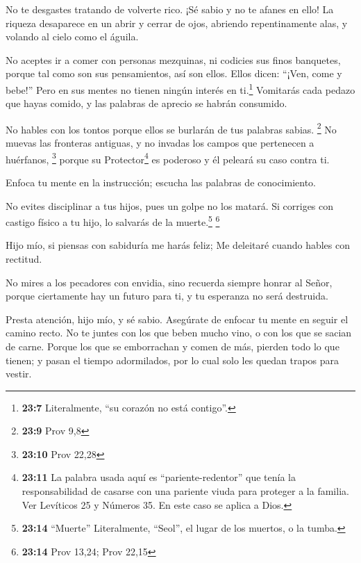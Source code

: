 No te desgastes tratando de volverte rico. ¡Sé sabio y no
te afanes en ello!  La riqueza desaparece en un abrir y
cerrar de ojos, abriendo repentinamente alas, y volando al cielo como el
águila.

 No aceptes ir a comer con personas mezquinas, ni codicies
sus finos banquetes,  porque tal como son sus
pensamientos, así son ellos. Ellos dicen: ``¡Ven, come y bebe!'' Pero en
sus mentes no tienen ningún interés en ti.\footnote{\textbf{23:7}
  Literalmente, ``su corazón no está contigo''.} 
Vomitarás cada pedazo que hayas comido, y las palabras de aprecio se
habrán consumido.

 No hables con los tontos porque ellos se burlarán de tus
palabras sabias. \footnote{\textbf{23:9} Prov 9,8}  No
muevas las fronteras antiguas, y no invadas los campos que pertenecen a
huérfanos, \footnote{\textbf{23:10} Prov 22,28}  porque
su Protector\footnote{\textbf{23:11} La palabra usada aquí es
  ``pariente-redentor'' que tenía la responsabilidad de casarse con una
  pariente viuda para proteger a la familia. Ver Levíticos 25 y Números
  35. En este caso se aplica a Dios.} es poderoso y él peleará su caso
contra ti.

 Enfoca tu mente en la instrucción; escucha las palabras
de conocimiento.

 No evites disciplinar a tus hijos, pues un golpe no los
matará.  Si corriges con castigo físico a tu hijo, lo
salvarás de la muerte.\footnote{\textbf{23:14} ``Muerte'' Literalmente,
  ``Seol'', el lugar de los muertos, o la tumba.} \footnote{\textbf{23:14}
  Prov 13,24; Prov 22,15}

 Hijo mío, si piensas con sabiduría me harás feliz;
 Me deleitaré cuando hables con rectitud.

 No mires a los pecadores con envidia, sino recuerda
siempre honrar al Señor,  porque ciertamente hay un
futuro para ti, y tu esperanza no será destruida.

 Presta atención, hijo mío, y sé sabio. Asegúrate de
enfocar tu mente en seguir el camino recto.  No te juntes
con los que beben mucho vino, o con los que se sacian de carne.
 Porque los que se emborrachan y comen de más, pierden
todo lo que tienen; y pasan el tiempo adormilados, por lo cual solo les
quedan trapos para vestir.

